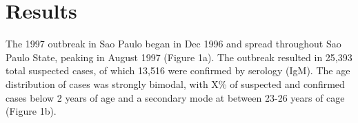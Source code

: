 \section{\texorpdfstring{\textbf{Results}}{Results}}\label{results}

The 1997 outbreak in Sao Paulo began in Dec 1996 and spread throughout
Sao Paulo State, peaking in August 1997 (Figure 1a). The outbreak
resulted in 25,393 total suspected cases, of which 13,516 were confirmed
by serology (IgM). The age distribution of cases was strongly bimodal,
with X\% of suspected and confirmed cases below 2 years of age and a
secondary mode at between 23-26 years of cage (Figure 1b).